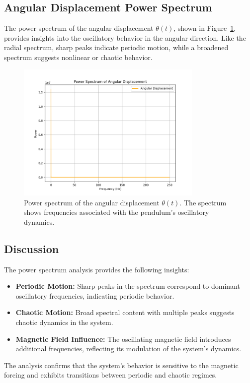\documentclass[12pt]{article}
\begin{document}
\subsection{Angular Displacement Power Spectrum}
The power spectrum of the angular displacement \( \theta(t) \), shown in Figure~\ref{fig:power_spectrum_angular}, provides insights into the oscillatory behavior in the angular direction. Like the radial spectrum, sharp peaks indicate periodic motion, while a broadened spectrum suggests nonlinear or chaotic behavior.

\begin{figure}[h!]
    \centering
    \includegraphics[width=0.8\textwidth]{power_spectrum_angular.png}
    \caption{Power spectrum of the angular displacement \( \theta(t) \). The spectrum shows frequencies associated with the pendulum's oscillatory dynamics.}
    \label{fig:power_spectrum_angular}
\end{figure}

\subsection{Discussion}
The power spectrum analysis provides the following insights:
\begin{itemize}
    \item \textbf{Periodic Motion:} Sharp peaks in the spectrum correspond to dominant oscillatory frequencies, indicating periodic behavior.
    \item \textbf{Chaotic Motion:} Broad spectral content with multiple peaks suggests chaotic dynamics in the system.
    \item \textbf{Magnetic Field Influence:} The oscillating magnetic field introduces additional frequencies, reflecting its modulation of the system's dynamics.
\end{itemize}
The analysis confirms that the system's behavior is sensitive to the magnetic forcing and exhibits transitions between periodic and chaotic regimes.
\end{document}
